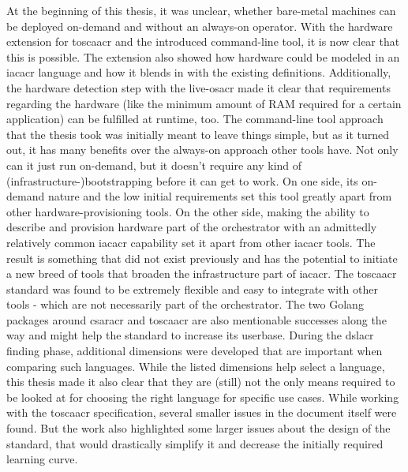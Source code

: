At the beginning of this thesis, it was unclear, whether bare-metal machines can be deployed on-demand and without an always-on operator. With the hardware extension for \gls{toscaacr} and the introduced command-line tool, it is now clear that this is possible.
\newline
The extension also showed how hardware could be modeled in an \gls{iacacr} language and how it blends in with the existing definitions.
\newline
Additionally, the hardware detection step with the live-\gls{osacr} made it clear that requirements regarding the hardware (like the minimum amount of RAM required for a certain application) can be fulfilled at runtime, too.
\newline\smallskip
The command-line tool approach that the thesis took was initially meant to leave things simple, but as it turned out, it has many benefits over the always-on approach other tools have. Not only can it just run on-demand, but it doesn't require any kind of (infrastructure-)bootstrapping before it can get to work.
\newline
On one side, its on-demand nature and the low initial requirements set this tool greatly apart from other hardware-provisioning tools. On the other side, making the ability to describe and provision hardware part of the orchestrator with an admittedly relatively common \gls{iacacr} capability set it apart from other \gls{iacacr} tools. The result is something that did not exist previously and has the potential to initiate a new breed of tools that broaden the infrastructure part of \gls{iacacr}.
\newline\smallskip
The \gls{toscaacr} standard was found to be extremely flexible and easy to integrate with other tools - which are not necessarily part of the orchestrator. The two Golang packages around \gls{csaracr} and \gls{toscaacr} are also mentionable successes along the way and might help the standard to increase its userbase.
\newline
During the \gls{dslacr} finding phase, additional dimensions were developed that are important when comparing such languages. While the listed dimensions help select a language, this thesis made it also clear that they are (still) not the only means required to be looked at for choosing the right language for specific use cases.
\newline
While working with the \gls{toscaacr} specification, several smaller issues in the document itself were found. But the work also highlighted some larger issues about the design of the standard, that would drastically simplify it and decrease the initially required learning curve.
